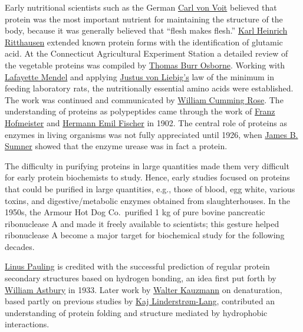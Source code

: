Early nutritional scientists such as the German
\href{https://en.wikipedia.org/wiki/Carl_von_Voit}{Carl von Voit}
believed that protein was the most important nutrient for maintaining
the structure of the body, because it was generally believed that
``flesh makes flesh.''
\href{https://en.wikipedia.org/wiki/Karl_Heinrich_Ritthausen}{Karl
Heinrich Ritthausen} extended known protein forms with the
identification of glutamic acid. At the Connecticut Agricultural
Experiment Station a detailed review of the vegetable proteins was
compiled by
\href{https://en.wikipedia.org/wiki/Thomas_Burr_Osborne_(chemist)}{Thomas
Burr Osborne}. Working with
\href{https://en.wikipedia.org/wiki/Lafayette_Mendel}{Lafayette Mendel}
and applying
\href{https://en.wikipedia.org/wiki/Justus_von_Liebig}{Justus von
Liebig's} law of the minimum in feeding laboratory rats, the
nutritionally essential amino acids were established. The work was
continued and communicated by
\href{https://en.wikipedia.org/wiki/William_Cumming_Rose}{William
Cumming Rose}. The understanding of proteins as polypeptides came
through the work of
\href{https://en.wikipedia.org/wiki/Franz_Hofmeister}{Franz Hofmeister}
and \href{https://en.wikipedia.org/wiki/Emil_Fischer}{Hermann Emil
Fischer} in 1902. The central role of proteins as enzymes in living
organisms was not fully appreciated until 1926, when
\href{https://en.wikipedia.org/wiki/James_B._Sumner}{James B. Sumner}
showed that the enzyme urease was in fact a protein.

The difficulty in purifying proteins in large quantities made them very
difficult for early protein biochemists to study. Hence, early studies
focused on proteins that could be purified in large quantities, e.g.,
those of blood, egg white, various toxins, and digestive/metabolic
enzymes obtained from slaughterhouses. In the 1950s, the Armour Hot Dog
Co.~purified 1 kg of pure bovine pancreatic ribonuclease A and made it
freely available to scientists; this gesture helped ribonuclease A
become a major target for biochemical study for the following decades.

\href{https://en.wikipedia.org/wiki/Linus_Pauling}{Linus Pauling} is
credited with the successful prediction of regular protein secondary
structures based on hydrogen bonding, an idea first put forth by
\href{https://en.wikipedia.org/wiki/William_Astbury}{William Astbury} in
1933. Later work by
\href{https://en.wikipedia.org/wiki/Walter_Kauzmann}{Walter Kauzmann} on
denaturation, based partly on previous studies by
\href{https://en.wikipedia.org/wiki/Kaj_Ulrik_Linderstrøm-Lang}{Kaj
Linderstrøm-Lang}, contributed an understanding of protein folding and
structure mediated by hydrophobic interactions.

